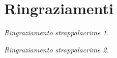 \chapter*{Ringraziamenti}
\thispagestyle{empty}

\begin{flushleft}

\textit{Ringraziamento strappalacrime 1.}

\medskip

\textit{Ringraziamento strappalacrime 2.}

\end{flushleft}

